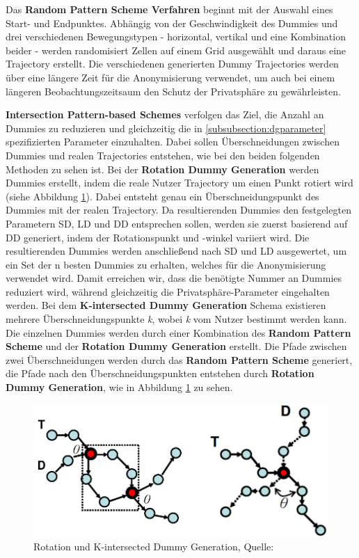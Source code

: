 Das \textbf{Random Pattern Scheme Verfahren} \cite{You2007} beginnt mit der Auswahl eines Start- und Endpunktes. Abhängig von der Geschwindigkeit des Dummies und drei verschiedenen Bewegungstypen - horizontal, vertikal und eine Kombination beider - werden randomisiert Zellen auf einem Grid ausgewählt und daraus eine Trajectory erstellt. Die verschiedenen generierten Dummy Trajectories werden über eine längere Zeit für die Anonymisierung verwendet, um auch bei einem längeren Beobachtungszeitsaum den Schutz der Privatsphäre zu gewährleisten.

\textbf{Intersection Pattern-based Schemes} \cite{Lei2012} verfolgen das Ziel, die Anzahl an Dummies zu reduzieren und gleichzeitig die in \ref{subsubsection:dgparameter} spezifizierten Parameter einzuhalten. Dabei sollen Überschneidungen zwischen Dummies und realen Trajectories entstehen, wie bei den beiden folgenden Methoden zu sehen ist. Bei der \textbf{Rotation Dummy Generation} werden Dummies erstellt, indem die reale Nutzer Trajectory um einen Punkt rotiert wird (siehe Abbildung \ref{fig_Lei2012}). Dabei entsteht genau ein Überschneidungspunkt des Dummies mit der realen Trajectory. Da resultierenden Dummies den festgelegten Parametern SD, LD und DD entsprechen sollen, werden sie zuerst basierend auf DD generiert, indem der Rotationspunkt und -winkel variiert wird. Die resultierenden Dummies werden anschließend nach SD und LD ausgewertet, um ein Set der n besten Dummies zu erhalten, welches für die Anonymisierung verwendet wird. Damit erreichen wir, dass die benötigte Nummer an Dummies reduziert wird, während gleichzeitig die Privatsphäre-Parameter eingehalten werden. Bei dem \textbf{K-intersected Dummy Generation} Schema existieren mehrere Überschneidungspunkte \textit{k}, wobei \textit{k} vom Nutzer bestimmt werden kann. Die einzelnen Dummies werden durch einer Kombination des \textbf{Random Pattern Scheme} und der \textbf{Rotation Dummy Generation} erstellt. Die Pfade zwischen zwei Überschneidungen werden durch das \textbf{Random Pattern Scheme} generiert, die Pfade nach den Überschneidungspunkten entstehen durch \textbf{Rotation Dummy Generation}, wie in Abbildung \ref{fig_Lei2012} zu sehen.
\begin{figure}[!h]
	\centering
	\includegraphics[width=\linewidth]{Bilder/Lei2012.png}
	\caption{Rotation und K-intersected Dummy Generation, Quelle: \protect\cite{Lei2012}}
	\label{fig_Lei2012}
\end{figure}

